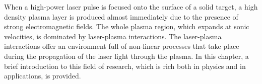 When a high-power laser pulse is focused onto the surface of a solid target, a high density plasma layer is produced almost immediately due to the presence of strong electromagnetic fields. The whole plasma region, which expands at sonic velocities, is dominated by laser-plasma interactions. The laser-plasma interactions offer an environment full of non-linear processes that take place during the propagation of the laser light through the plasma. In this chapter, a brief introduction to this field of research, which is rich both in physics and in applications, is provided. 

